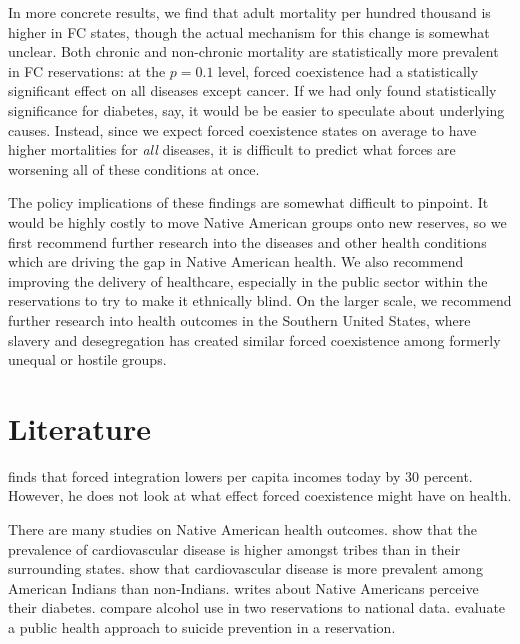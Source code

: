\documentclass[12pt]{article}
\begin{document}
In more concrete results, we find that adult mortality per hundred thousand is higher in FC states, though the actual mechanism for this change is somewhat unclear.
Both chronic and non-chronic mortality are statistically more prevalent in FC reservations: at the $p=0.1$ level, forced coexistence had a statistically significant effect on all diseases except cancer.
If we had only found statistically significance for diabetes, say, it would be be easier to speculate about underlying causes.
Instead, since we expect forced coexistence states on average to have higher mortalities for \emph{all} diseases, it is difficult to predict what forces are worsening all of these conditions at once.

The policy implications of these findings are somewhat difficult to pinpoint.  
It would be highly costly to move Native American groups onto new reserves, so we first recommend further research into the diseases and other health conditions which are driving the gap in Native American health. 
We also recommend improving the delivery of healthcare, especially in the public sector within the reservations to try to make it ethnically blind. 
On the larger scale, we recommend further research into health outcomes in the Southern United States, where slavery and desegregation has created similar forced coexistence among formerly unequal or hostile groups.  


\section{Literature}
\cite{dippel2010forced} finds that forced integration lowers per capita incomes today by 30 percent. However, he does not look at what effect forced coexistence might have on health.

There are many studies on Native American health outcomes. 
\cite{levin2002geographic} show that the prevalence of cardiovascular disease is higher amongst tribes than in their surrounding states.
\cite{harwell2001cardiovascular} show that cardiovascular disease is more prevalent among American Indians than non-Indians.
\cite{patel2013health} writes about Native Americans perceive their diabetes.
\cite{beals2003racial} compare alcohol use in two reservations to national data.
\cite{may2005outcome} evaluate a public health approach to suicide prevention in a reservation.
\end{document}
